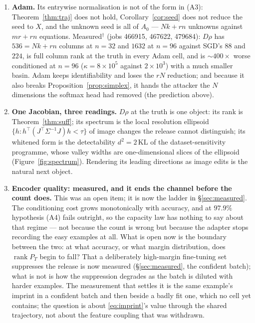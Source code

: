 \begin{enumerate}
  mixture remains the recipe-unknown approximation.
\item \textbf{Adam.} Its entrywise normalisation is not of the form in
  (A3): Theorem~\ref{thm:traj} does not hold, Corollary~\ref{cor:seed} does
  not reduce the seed to $X$, and the unknown seed is all of $A_0$ —
  $Nk+rn$ unknowns against $mr+rn$ equations. Measured$^\dagger$ (jobs
  466915, 467622, 479684): $D\rho$ has $536=Nk+rn$ columns at $n=32$ and
  $1632$ at $n=96$ against SGD's $88$ and $224$, is full column rank at the
  truth in every Adam cell, and is $\sim\!400\times$ worse conditioned at
  $n=96$ ($\kappa=8\times10^{5}$ against $2\times10^{3}$) with a much smaller
  basin. Adam keeps identifiability and loses the $rN$ reduction; and because
  it also breaks Proposition~\ref{prop:simplex}, it hands the attacker the
  $N$ dimensions the softmax head had removed (the prediction above).
\item \textbf{One Jacobian, three readings.} $D\rho$ at the truth is one
  object: its rank is Theorem~\ref{thm:suff}; its spectrum is the local
  resolution ellipsoid $\{h:h^{\!\top}(J^{\!\top}\Sigma^{-1}J)h<\tau\}$ of image
  changes the release cannot distinguish; its whitened form is the
  detectability $d^2=2\,\mathrm{KL}$ of the dataset-sensitivity programme,
  whose valley widths are one-dimensional slices of the ellipsoid
  (Figure~\ref{fig:spectrum}). Rendering its leading directions as image
  edits is the natural next object.
\item \textbf{Encoder quality: measured, and it ends the channel before the
  count does.} This was an open item; it is now the ladder in
  \S\ref{sec:measured}. The conditioning cost grows monotonically with
  accuracy, and at $97.9\%$ hypothesis (A4) fails outright, so the capacity
  law has nothing to say about that regime — not because the count is wrong
  but because the adapter stops recording the easy examples at all. What is
  open now is the boundary between the two: at what accuracy, or what margin
  distribution, does $\operatorname{rank}P_T$ begin to fall? That a
  deliberately high-margin fine-tuning set suppresses the release is now
  measured (\S\ref{sec:measured}, the confident batch); what is not is how
  the suppression degrades as the batch is diluted with harder examples. The
  measurement that settles it is the same example's imprint in a confident
  batch and then beside a badly fit one, which no cell yet contains; the
  question is about \eqref{eq:imprint}'s value through the shared trajectory,
  not about the feature coupling that was withdrawn.

\end{enumerate}
